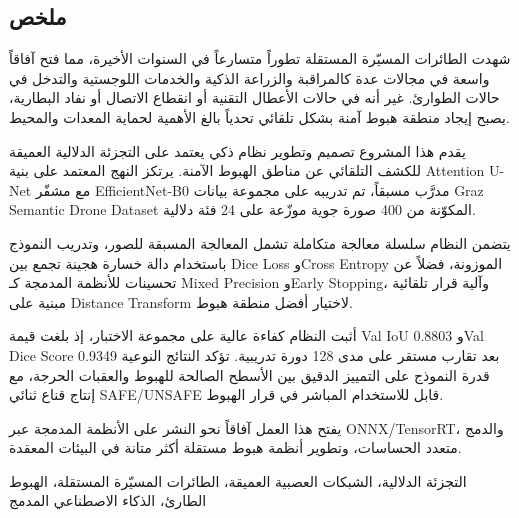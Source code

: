 \clearpage

\begin{otherlanguage}{arabic}
\chapter*{ملخص}

شهدت الطائرات المسيّرة المستقلة تطوراً متسارعاً في السنوات الأخيرة، مما فتح آفاقاً واسعة في مجالات عدة كالمراقبة والزراعة الذكية والخدمات اللوجستية والتدخل في حالات الطوارئ. غير أنه في حالات الأعطال التقنية أو انقطاع الاتصال أو نفاد البطارية، يصبح إيجاد منطقة هبوط آمنة بشكل تلقائي تحدياً بالغ الأهمية لحماية المعدات والمحيط.

يقدم هذا المشروع تصميم وتطوير نظام ذكي يعتمد على التجزئة الدلالية العميقة للكشف التلقائي عن مناطق الهبوط الآمنة. يرتكز النهج المعتمد على بنية Attention U-Net مع مشفّر EfficientNet-B0 مدرَّب مسبقاً، تم تدريبه على مجموعة بيانات Graz Semantic Drone Dataset المكوّنة من 400 صورة جوية موزّعة على 24 فئة دلالية.

يتضمن النظام سلسلة معالجة متكاملة تشمل المعالجة المسبقة للصور، وتدريب النموذج باستخدام دالة خسارة هجينة تجمع بين Dice Loss وCross Entropy الموزونة، فضلاً عن تحسينات للأنظمة المدمجة كـ Mixed Precision وEarly Stopping، وآلية قرار تلقائية مبنية على Distance Transform لاختيار أفضل منطقة هبوط.

أثبت النظام كفاءة عالية على مجموعة الاختبار، إذ بلغت قيمة Val IoU 0.8803 وVal Dice Score 0.9349 بعد تقارب مستقر على مدى 128 دورة تدريبية. تؤكد النتائج النوعية قدرة النموذج على التمييز الدقيق بين الأسطح الصالحة للهبوط والعقبات الحرجة، مع إنتاج قناع ثنائي SAFE/UNSAFE قابل للاستخدام المباشر في قرار الهبوط.

يفتح هذا العمل آفاقاً نحو النشر على الأنظمة المدمجة عبر ONNX/TensorRT، والدمج متعدد الحساسات، وتطوير أنظمة هبوط مستقلة أكثر متانة في البيئات المعقدة.

\vspace{0.8em}
\begin{tcolorbox}[
  colback=ENIADLightBlue!40, colframe=ENIADBlue,
  title={\textbf{الكلمات المفتاحية}}, fonttitle=\bfseries\small,
  arc=4pt, boxrule=0.8pt,
  halign=right, halign title=right
]
  التجزئة الدلالية، الشبكات العصبية العميقة، الطائرات المسيّرة المستقلة، الهبوط الطارئ، الذكاء الاصطناعي المدمج
\end{tcolorbox}
\end{otherlanguage}

\clearpage
